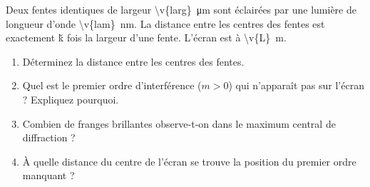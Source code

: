 Deux fentes identiques de largeur \qty{\v{larg}}{\micro\metre} sont éclairées par une lumière de longueur d'onde \qty{\v{lam}}{nm}. La distance entre les centres des fentes est exactement \v{k} fois la largeur d'une fente. L'écran est à \qty{\v{L}}{m}.

\begin{enumerate}[label=\alph*)]
    \item Déterminez la distance entre les centres des fentes.
    \item Quel est le premier ordre d'interférence ($m > 0$) qui n'apparaît pas sur l'écran ? Expliquez pourquoi.
    \item Combien de franges brillantes observe-t-on dans le maximum central de diffraction ?
    \item À quelle distance du centre de l'écran se trouve la position du premier ordre manquant ?
\end{enumerate}
